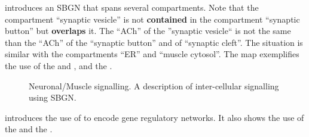  introduces an SBGN \PD that spans several compartments. Note that the compartment ``synaptic vesicle'' is not \textbf{contained} in the compartment ``synaptic button'' but \textbf{overlaps} it. The  ``ACh'' of the ''synaptic vesicle`` is not the same  than the ``ACh'' of the ``synaptic button'' and of ``synaptic cleft''.  The situation is similar with the compartments ``ER'' and ``muscle cytosol''.  The map exemplifies the use of the   and , and the  .

\begin{figure}[htb]
\begin{center}
\caption{Neuronal/Muscle signalling. A description of inter-cellular signalling using SBGN.}\label{fig:muscle}
\end{center}
\end{figure}

 introduces the use of \SBGNPDLone to encode gene regulatory networks. It also shows the use of the  and the  .


